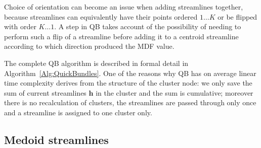 \documentclass{bioinfo}
\begin{document}
\begin{methods}

Choice of orientation can become an issue when 
adding streamlines together, because 
streamlines
can equivalently have their points ordered $1 \dots K$ or be flipped with
order $K \dots 1$.
A step in QB takes account of the
possibility of needing to perform such a flip of a streamline before adding
it to a centroid streamline according to which direction produced
the MDF value.

The complete QB algorithm is described in formal detail in
Algorithm~\ref{Alg:QuickBundles}.  One of the reasons why
QB has on average linear time complexity derives from the structure of
the cluster node: we only save the sum of current streamlines
$\mathbf{h}$ in the cluster and the sum is cumulative; moreover there is
no recalculation of clusters, the streamlines are passed through only
once and a streamline is assigned to one cluster only.

\subsection{Medoid streamlines\label{sub:medoids}}


\end{methods}
\end{document}
